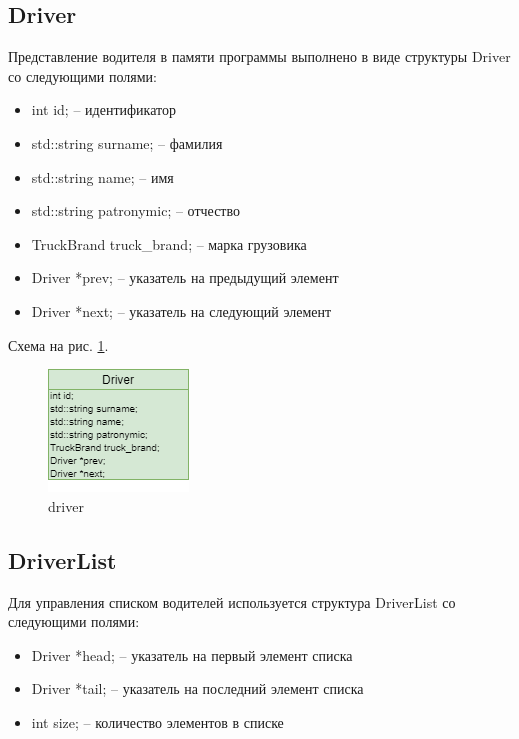 \subsection{Driver}

Представление водителя в памяти программы выполнено в виде структуры Driver со следующими полями:

\begin{itemize}
    \item int id; -- идентификатор
    \item std::string surname; -- фамилия 
    \item std::string name; -- имя
    \item std::string patronymic; -- отчество
    \item TruckBrand truck\_brand; -- марка грузовика
    \item Driver *prev; -- указатель на предыдущий элемент
    \item Driver *next; -- указатель на следующий элемент
\end{itemize}

Схема на рис. \ref{driver}.

\begin{figure}[hpt!]
    \centering
    \includegraphics[width=0.4\linewidth]{photo/data_structures/driver}
    \caption{driver}
    \label{driver}
\end{figure}

\subsection{DriverList}

Для управления списком водителей используется структура DriverList со следующими полями:

\begin{itemize}
    \item Driver *head; -- указатель на первый элемент списка
    \item Driver *tail; -- указатель на последний элемент списка
    \item int size; -- количество элементов в списке
\end{itemize}

